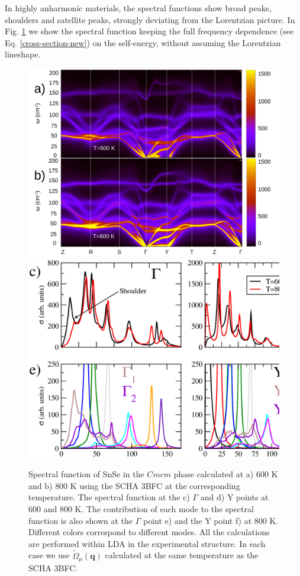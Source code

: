 In highly anharmonic materials\cite{ribeiro2018strong,li2014phonon,bianco2018high,delaire2011giant,paulatto2015first}, the spectral functions show broad peaks, shoulders and satellite peaks, strongly deviating from the Lorentzian 
picture. In Fig. \ref{spectral-snse} we show the spectral function keeping the full frequency dependence (see Eq. \ref{cross-section-new}) on the self-energy, without assuming the Lorentzian lineshape.
\begin{figure}[h]
\begin{center}
\includegraphics[width=0.80\linewidth]{Figures/full-ins-snse.pdf}
\includegraphics[width=0.80\linewidth]{Figures/ins-snse.eps}
\caption[Nonperturbative spectral function in SnSe.]{Spectral function of SnSe in the $Cmcm$ phase calculated at a) $600$ K and b) $800$ K using the SCHA 3BFC at the corresponding temperature. The spectral function at the c) $\Gamma$ 
and d) Y points at $600$ and $800$ K. The contribution of each mode to the spectral function is also shown at the $\Gamma$ point e) and the Y point f) at $800$ K. Different colors correspond to different modes. All the calculations are 
performed within LDA in the experimental structure. In each case we use $\tilde{\Omega}_{\mu}(\mathbf{q})$ calculated at the same temperature as the SCHA 3BFC.}
\label{spectral-snse}
\end{center}
\end{figure}
